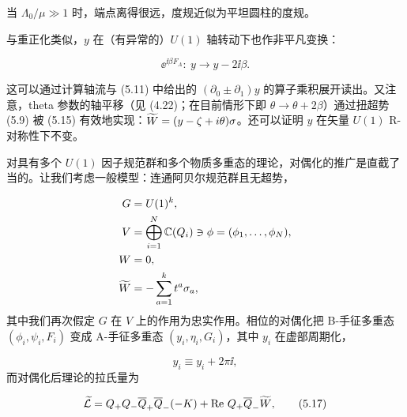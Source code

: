当 $\Lambda_0/\mu\gg1$ 时，端点离得很远，度规近似为平坦圆柱的度规。

与重正化类似，$y$ 在（有异常的）$U(1)$ 轴转动下也作非平凡变换：

\begin{equation}
    \ee^{\ii\beta F_A}:\ y\longrightarrow y-2\ii\beta.
    \tag{5.15}
\end{equation}

这可以通过计算轴流与 (5.11) 中给出的 $(\partial_0\pm\partial_1)y$ 的算子乘积展开读出。又注意，theta 参数的轴平移（见 (4.22)；在目前情形下即 $\theta\to\theta+2\beta$）通过扭超势 (5.9) 被 (5.15) 有效地实现：$\widetilde{W}=(y-\zeta+i\theta)\sigma$。还可以证明 $y$ 在矢量 $U(1)$ R-对称性下不变。



对具有多个 $U(1)$ 因子规范群和多个物质多重态的理论，对偶化的推广是直截了当的。让我们考虑一般模型：连通阿贝尔规范群且无超势，

\[
\begin{aligned}
    G&=U(1)^k,\\
    V&=\bigoplus_{i=1}^{N}\mathbb{C}(Q_i)\ni\phi=(\phi_1,\dots,\phi_N),\\
    W&=0,\\
    \widetilde{W}&=-\sum_{a=1}^{k}t^a\sigma_a,
\end{aligned}
\]
其中我们再次假定 $G$ 在 $V$ 上的作用为忠实作用。相位的对偶化把 B-手征多重态 $(\phi_i,\psi_i,F_i)$ 变成 A-手征多重态 $(y_i,\eta_i,G_i)$，其中 $y_i$ 在虚部周期化，

\begin{equation}
    y_i\equiv y_i+2\pi\ii,
    \tag{5.16}
\end{equation}
而对偶化后理论的拉氏量为

\begin{equation}
    \widetilde{\mathcal{L}}=Q_+Q_-\overline{Q}_+\overline{Q}_-(-K)+\operatorname{Re}\,Q_+\overline{Q}_-\widetilde{W},
    \tag{5.17}
\end{equation}

